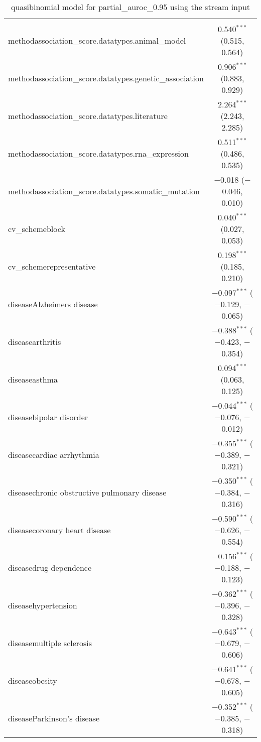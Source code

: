 
\begin{table}[!htbp] \centering 
  \caption{quasibinomial model for partial_auroc_0.95 using the stream input} 
  \label{} 
\begin{tabular}{@{\extracolsep{5pt}}lc} 
\\[-1.8ex]\hline 
\hline \\[-1.8ex] 
 methodassociation\_score.datatypes.animal\_model & 0.540$^{***}$ (0.515, 0.564) \\ 
  methodassociation\_score.datatypes.genetic\_association & 0.906$^{***}$ (0.883, 0.929) \\ 
  methodassociation\_score.datatypes.literature & 2.264$^{***}$ (2.243, 2.285) \\ 
  methodassociation\_score.datatypes.rna\_expression & 0.511$^{***}$ (0.486, 0.535) \\ 
  methodassociation\_score.datatypes.somatic\_mutation & $-$0.018 ($-$0.046, 0.010) \\ 
  cv\_schemeblock & 0.040$^{***}$ (0.027, 0.053) \\ 
  cv\_schemerepresentative & 0.198$^{***}$ (0.185, 0.210) \\ 
  diseaseAlzheimers disease & $-$0.097$^{***}$ ($-$0.129, $-$0.065) \\ 
  diseasearthritis & $-$0.388$^{***}$ ($-$0.423, $-$0.354) \\ 
  diseaseasthma & 0.094$^{***}$ (0.063, 0.125) \\ 
  diseasebipolar disorder & $-$0.044$^{***}$ ($-$0.076, $-$0.012) \\ 
  diseasecardiac arrhythmia & $-$0.355$^{***}$ ($-$0.389, $-$0.321) \\ 
  diseasechronic obstructive pulmonary disease & $-$0.350$^{***}$ ($-$0.384, $-$0.316) \\ 
  diseasecoronary heart disease & $-$0.590$^{***}$ ($-$0.626, $-$0.554) \\ 
  diseasedrug dependence & $-$0.156$^{***}$ ($-$0.188, $-$0.123) \\ 
  diseasehypertension & $-$0.362$^{***}$ ($-$0.396, $-$0.328) \\ 
  diseasemultiple sclerosis & $-$0.643$^{***}$ ($-$0.679, $-$0.606) \\ 
  diseaseobesity & $-$0.641$^{***}$ ($-$0.678, $-$0.605) \\ 
  diseaseParkinson's disease & $-$0.352$^{***}$ ($-$0.385, $-$0.318) \\ 

\end{tabular}
\end{table}
